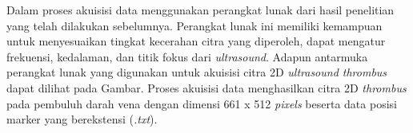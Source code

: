%

Dalam proses akuisisi data menggunakan perangkat lunak dari hasil penelitian yang telah dilakukan sebelumnya. Perangkat lunak ini memiliki kemampuan untuk menyesuaikan tingkat kecerahan citra yang diperoleh, dapat mengatur frekuensi, kedalaman, dan titik fokus dari \textit{ultrasound}. Adapun antarmuka perangkat lunak yang digunakan untuk akuisisi citra 2D \textit{ultrasound thrombus} dapat dilihat pada Gambar. Proses akuisisi data menghasilkan citra 2D \textit{thrombus} pada pembuluh darah vena dengan dimensi 661 x 512 \textit{pixels} beserta data posisi marker yang berekstensi (\textit{.txt}). 



